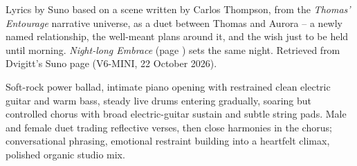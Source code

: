 
\label{sec:stay-here-beside-me}
\begin{notes}
Lyrics by Suno based on a scene written by Carlos Thompson, from the \emph{Thomas' Entourage} narrative universe, as a duet between Thomas and Aurora -- a newly named relationship, the well-meant plans around it, and the wish just to be held until morning. \emph{Night-long Embrace} (page \pageref{sec:night-long-embrace}) sets the same night. Retrieved from Dvigitt's Suno page (V6-MINI, 22 October 2026).
\end{notes}
\begin{style}
Soft-rock power ballad, intimate piano opening with restrained clean electric guitar and warm bass, steady live drums entering gradually, soaring but controlled chorus with broad electric-guitar sustain and subtle string pads. Male and female duet trading reflective verses, then close harmonies in the chorus; conversational phrasing, emotional restraint building into a heartfelt climax, polished organic studio mix.
\end{style}

